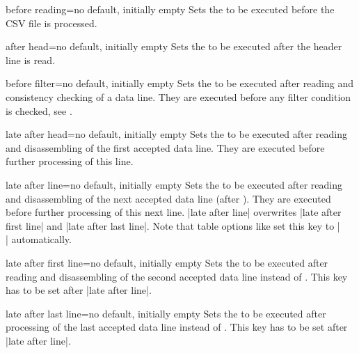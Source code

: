 \documentclass[a4paper,11pt]{ltxdoc}
\begin{document}
\begin{docCsvKey}{before reading}{=}{no default, initially empty}
  Sets the  to be executed before the CSV file is processed.
\end{docCsvKey}

\begin{docCsvKey}{after head}{=}{no default, initially empty}
  Sets the  to be executed after the header line is read.
\end{docCsvKey}

\begin{docCsvKey}{before filter}{=}{no default, initially empty}
  Sets the  to be executed after reading and consistency checking
  of a data line. They are executed before any filter condition is checked,
  see .
\end{docCsvKey}

\begin{docCsvKey}{late after head}{=}{no default, initially empty}
  Sets the  to be executed after reading and disassembling
  of the first accepted data line. They are executed before further processing
  of this line.
\end{docCsvKey}

\begin{docCsvKey}{late after line}{=}{no default, initially empty}
  Sets the  to be executed after reading and disassembling
  of the next accepted data line (after ).
  They are executed before further processing of this next line.
  |late after line| overwrites |late after first line| and |late after last line|.
  Note that table options like  set this key to |\\|
  automatically.
\end{docCsvKey}


\begin{docCsvKey}{late after first line}{=}{no default, initially empty}
  Sets the  to be executed after reading and disassembling
  of the second accepted data line instead of .
  This key has to be set after |late after line|.
\end{docCsvKey}


\begin{docCsvKey}{late after last line}{=}{no default, initially empty}
  Sets the  to be executed after processing of the last
  accepted data line instead of .
  This key has to be set after |late after line|.
\end{docCsvKey}
\end{document}
